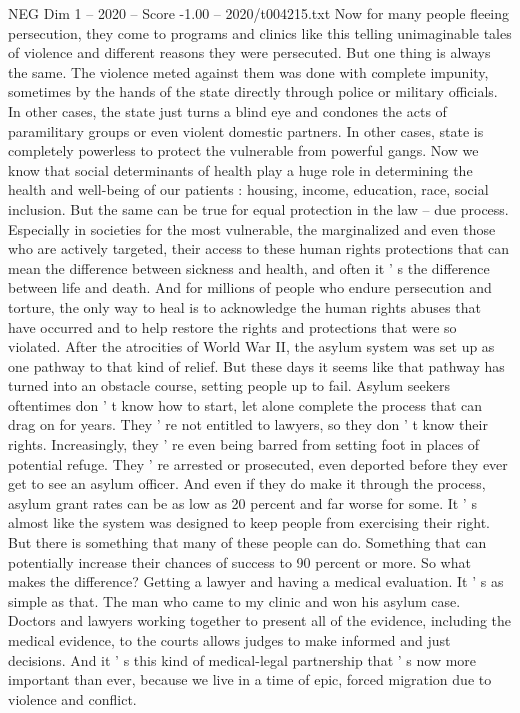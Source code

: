 \begin{textsample}{NEG Dim 1 – 2020 – Score -1.00 – 2020/t004215.txt}
Now for many people fleeing persecution, they come to programs and clinics like this telling unimaginable tales of violence and different reasons they were persecuted.
But one thing is always the same.
The violence meted against them was done with complete impunity, sometimes by the hands of the state directly through police or military officials.
In other cases, the state just turns a blind eye and condones the acts of paramilitary groups or even violent domestic partners.
In other cases, state is completely powerless to protect the vulnerable from powerful gangs.
Now we know that social determinants of health play a huge role in determining the health and well-being of our patients : housing, income, education, race, social inclusion.
But the same can be true for equal protection in the law -- due process.
Especially in societies for the most vulnerable, the marginalized and even those who are actively targeted, their access to these human rights protections that can mean the difference between sickness and health, and often it ' s the difference between life and death.
And for millions of people who endure persecution and torture, the only way to heal is to acknowledge the human rights abuses that have occurred and to help restore the rights and protections that were so violated.
After the atrocities of World War II, the asylum system was set up as one pathway to that kind of relief.
But these days it seems like that pathway has turned into an obstacle course, setting people up to fail.
Asylum seekers oftentimes don ' t know how to start, let alone complete the process that can drag on for years.
They ' re not entitled to lawyers, so they don ' t know their rights.
Increasingly, they ' re even being barred from setting foot in places of potential refuge.
They ' re arrested or prosecuted, even deported before they ever get to see an asylum officer.
And even if they do make it through the process, asylum grant rates can be as low as 20 percent and far worse for some.
It ' s almost like the system was designed to keep people from exercising their right.
But there is something that many of these people can do.
Something that can potentially increase their chances of success to 90 percent or more.
So what makes the difference?
Getting a lawyer and having a medical evaluation.
It ' s as simple as that.
The man who came to my clinic and won his asylum case.
Doctors and lawyers working together to present all of the evidence, including the medical evidence, to the courts allows judges to make informed and just decisions.
And it ' s this kind of medical-legal partnership that ' s now more important than ever, because we live in a time of epic, forced migration due to violence and conflict.

\end{textsample}
